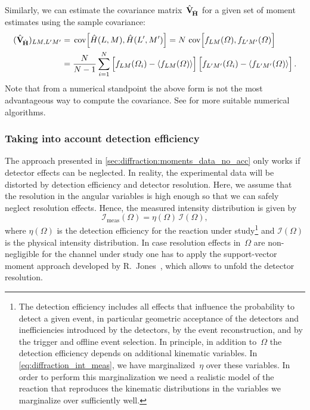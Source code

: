 Similarly, we can estimate the covariance
matrix~$\hat{\bm{\mathrm{V}}}_{\!\hat{\bm{\mathrm{H}}}}$ for a given set of moment
estimates using the sample covariance:
\begin{align}
  (\hat{\covMatSym}_{\!\hat{\vect{H}}})_{L M, L' M'}
  ={}& \cov[2]{\hat{H}(L, M), \hat{H}(L', M')}
  = N\, \cov[2]{f_{L M}(\Omega), f_{L' M'}(\Omega)} \notag
  \\
  \label{eq:diffraction_sample_cov}
  ={}& \frac{N}{N - 1} \sum_{i = 1}^N \sBrk[2]{f_{L M}(\Omega_i) - \mean{f_{L M}(\Omega)}} \sBrk[2]{f_{L' M'}(\Omega_i) - \mean{f_{L' M'}(\Omega)}}.
\end{align}
Note that from a numerical standpoint the above form is not the most
advantageous way to compute the covariance.  See
 for more suitable numerical
algorithms.


\subsubsection{Taking into account detection efficiency}%
\label{sec:diffraction:acceptance_corr}

The approach presented in \cref{sec:diffraction:moments_data_no_acc}
only works if detector effects can be neglected.  In reality, the
experimental data will be distorted by detection efficiency and
detector resolution.  Here, we assume that the resolution in the
angular variables is high enough so that we can safely neglect
resolution effects.  Hence, the measured intensity distribution is
given by
\begin{equation}
  \label{eq:diffraction_int_meas}
  \mathcal{I}_\text{meas}(\Omega)
  = \eta(\Omega)\, \mathcal{I}(\Omega),
\end{equation}
where $\eta(\Omega)$ is the detection efficiency for the reaction
under study\footnote{The detection efficiency includes all effects
that influence the probability to detect a given event, in particular
geometric acceptance of the detectors and inefficiencies introduced by
the detectors, by the event reconstruction, and by the trigger and
offline event selection.  In principle, in addition to~$\Omega$ the
detection efficiency depends on additional kinematic variables.  In
\cref{eq:diffraction_int_meas}, we have marginalized~$\eta$ over these
variables.  In order to perform this marginalization we need a
realistic model of the reaction that reproduces the kinematic
distributions in the variables we marginalize over sufficiently well.}
and $\mathcal{I}(\Omega)$ is the physical intensity distribution.  In case
resolution effects in~$\Omega$ are non-negligible for the channel
under study one has to apply the support-vector moment approach
developed by R.~Jones~\cite{Jones:2023}, which allows to unfold the
detector resolution.


